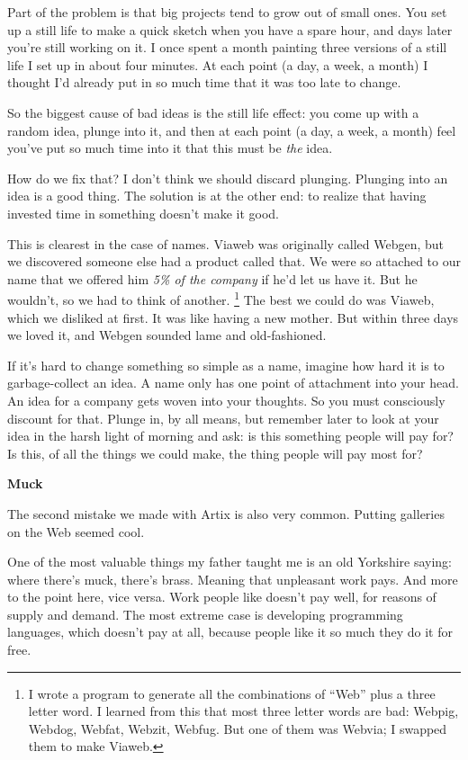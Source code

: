 \documentclass[12pt]{book}
\begin{document}
Part of the problem is that big projects tend to grow out of small ones.
You set up a still life to make a quick sketch when you have a spare
hour, and days later you're still working on it. I once spent a month
painting three versions of a still life I set up in about four minutes.
At each point (a day, a week, a month) I thought I'd already put in so
much time that it was too late to change.

So the biggest cause of bad ideas is the still life effect: you come up
with a random idea, plunge into it, and then at each point (a day, a
week, a month) feel you've put so much time into it that this must be
\emph{the} idea.

How do we fix that? I don't think we should discard plunging. Plunging
into an idea is a good thing. The solution is at the other end: to
realize that having invested time in something doesn't make it good.

This is clearest in the case of names. Viaweb was originally called
Webgen, but we discovered someone else had a product called that. We
were so attached to our name that we offered him \emph{5\% of the
company} if he'd let us have it. But he wouldn't, so we had to think of
another. \footnote{I wrote a program to generate all the combinations of ``Web''
plus a three letter word. I learned from this that most three letter
words are bad: Webpig, Webdog, Webfat, Webzit, Webfug. But one of them
was Webvia; I swapped them to make Viaweb.} The best we could do was Viaweb, which
we disliked at first. It was like having a new mother. But within three
days we loved it, and Webgen sounded lame and old-fashioned.

If it's hard to change something so simple as a name, imagine how hard
it is to garbage-collect an idea. A name only has one point of
attachment into your head. An idea for a company gets woven into your
thoughts. So you must consciously discount for that. Plunge in, by all
means, but remember later to look at your idea in the harsh light of
morning and ask: is this something people will pay for? Is this, of all
the things we could make, the thing people will pay most for?

\textbf{Muck}

The second mistake we made with Artix is also very common. Putting
galleries on the Web seemed cool.

One of the most valuable things my father taught me is an old Yorkshire
saying: where there's muck, there's brass. Meaning that unpleasant work
pays. And more to the point here, vice versa. Work people like doesn't
pay well, for reasons of supply and demand. The most extreme case is
developing programming languages, which doesn't pay at all, because
people like it so much they do it for free.
\end{document}
